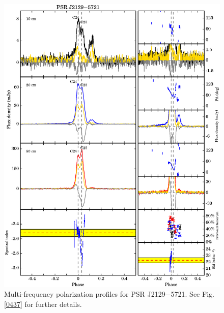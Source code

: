 \documentclass[useAMS,usenatbib]{mn2e}
\begin{document}
\begin{appendix}
\begin{figure}
\begin{center}
\includegraphics[width=6 in]{2129.ps}
\caption{Multi-frequency polarization profiles for PSR J2129$-$5721. 
See Fig. \ref{0437} for further details.}
\label{2129}
\end{center}
\end{figure}


\end{appendix}
\end{document}
